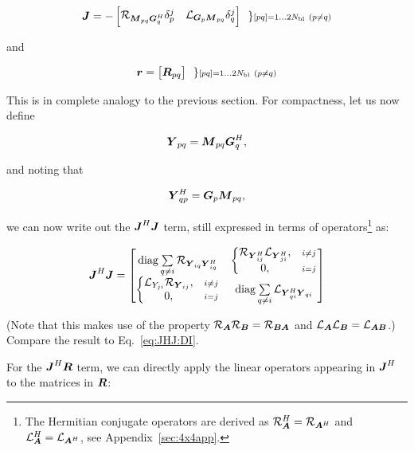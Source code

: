 \documentclass[useAMS,usenatbib]{mn2e}
\newcommand{\mat}[1]{{\bmath{#1}}}
\newcommand{\JJ}{\mat{J}} %
\newcommand{\MM}{\mat{M}}
\newcommand{\GG}{\mat{G}}
\newcommand{\JHJ}{\JJ^H\JJ} %
\begin{document}
\begin{equation}
\label{eq:JJ:pol}
\JJ = - \Matrix{cc}{ 
\Rop{ \MM_{pq}\GG^H_q }\delta^j_p & 
\Lop{ \GG_p \MM_{pq}  }\delta^j_q \\
}~~ 
\} \scriptstyle [pq]=1\dots 2\Nbl~(p\ne q)\\ 
\end{equation}

and 

\begin{equation}
\bmath{r} = \Matrix{c}{ \mat{R}_{pq}}~~ 
\} \scriptstyle [pq]=1\dots 2\Nbl~(p\ne q)\\ 
\end{equation}

This is in complete analogy to the previous section. For compactness, let us now define

\newcommand{\YY}{\mat{Y}}
\newcommand{\ZZ}{\mat{Z}}
\[
\YY_{pq} = \MM_{pq} \GG^H_q,
\]

and noting that 

\[
\YY_{qp}^H = \GG_p \MM_{pq},
\]

we can now write out the $\JHJ$ term, still expressed in terms of operators\footnote{The Hermitian
conjugate operators are derived as $\Rop{\mat{A}}^H=\Rop{\mat{A}^H}$ and $\Lop{\mat{A}}^H=\Lop{\mat{A}^H}$,
see Appendix~\ref{sec:4x4app}.} as:

\begin{equation}
\label{eq:JHJ:pol}
\JHJ = \Matrix{cc}{
  \mathrm{diag}\sum\limits_{q\ne i} \Rop{\YY_{iq} \YY^H_{iq}} & 
  \left \{ 
  \begin{array}{@{}cc@{}}
   \Rop{ \YY^H_{ij}  } \Lop{\YY^H_{ji}},&{\scriptstyle i\ne j} \\
   0, &{\scriptstyle i=j}
  \end{array} \right . 
  \\
  \left \{ 
  \begin{array}{@{}cc@{}}
   \Lop{ Y_{ji}  } \Rop{\YY_{ij}},&{\scriptstyle i\ne j} \\
   0, &{\scriptstyle i=j}
  \end{array} \right . 
  &
  \mathrm{diag}\sum\limits_{q\ne i} \Lop{\YY^H_{qi}\YY_{qi}}
}
\end{equation}

(Note that this makes use of the property $\Rop{\mat{A}}\Rop{\mat{B}}=\Rop{\mat{BA}}$ and 
$\Lop{\mat{A}}\Lop{\mat{B}}=\Lop{\mat{AB}}$.) Compare the result to Eq.~\ref{eq:JHJ:DI}.

For the $\JJ^H\bmath{R}$ term, we can directly apply the linear operators appearing in $\JJ^H$ 
to the matrices in $\bmath{R}$:
\end{document}
